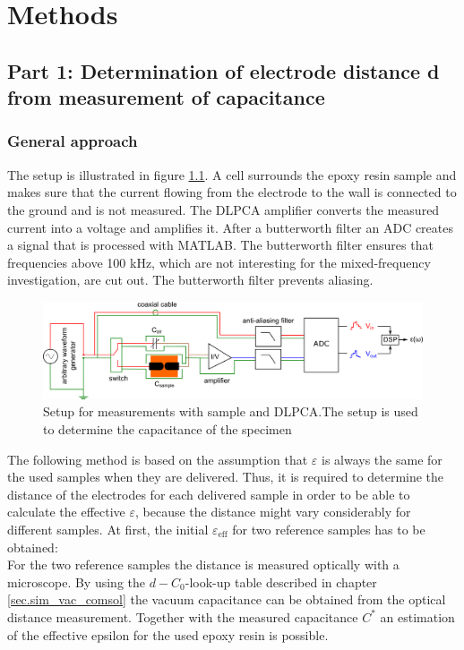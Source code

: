\chapter{Methods}
\section{Part 1: Determination of electrode distance d from measurement of capacitance}
\label{part1}
\subsection{General approach}
The setup is illustrated in figure \ref{sec.setup_amp_1}. A cell surrounds the  epoxy resin sample and makes sure that the current flowing from the electrode to the wall is connected to the ground and is not measured. The DLPCA amplifier \footnotemark converts the measured current into a voltage and amplifies it. After a butterworth filter an ADC creates a signal that is processed with MATLAB. The butterworth filter ensures that frequencies above 100 kHz, which are not interesting for the mixed-frequency investigation, are cut out. The butterworth filter prevents aliasing. 
\begin{figure}[htbp]
	\centering
	\includegraphics[width=\textwidth]{figures/Method/setup/setup_amplifier.png}		
	\caption[Kurze Abbildungsbeschreibung]{Setup for measurements with sample and DLPCA.The setup is used to determine the capacitance of the specimen \protect\footnotemark} 
	\label{sec.setup_amp_1}
\end{figure}

\label{sec:general_approach}
The following method is based on the assumption that  $\varepsilon$ is always the same for the used samples when they are delivered. Thus, it is required to determine the distance of the electrodes for each delivered sample in order to be able to calculate the effective $\varepsilon$, because the distance might vary considerably for different samples. 
At first, the initial $\varepsilon_{\textrm{eff}}$ for two reference samples has to be obtained:\\
For the two reference samples the distance is measured optically with a microscope. By using the $d-C_0$-look-up table described in  chapter \ref{sec.sim_vac_comsol} the vacuum capacitance can be obtained from the optical distance measurement. Together with the measured capacitance $C^*$ an estimation of the effective epsilon for the used epoxy resin is possible. 

